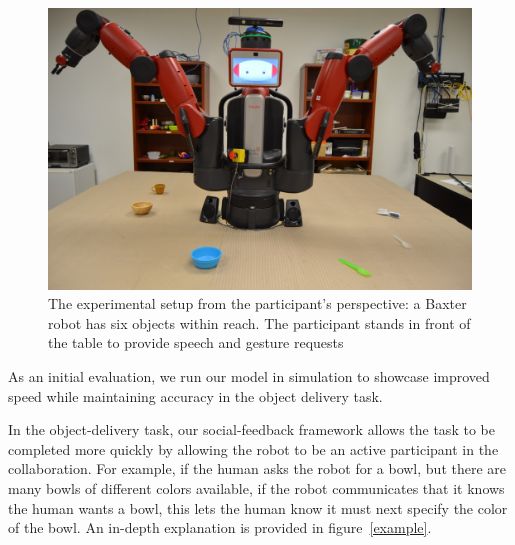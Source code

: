 \documentclass[conference]{IEEEtran}
\begin{document}
\begin{figure}[t]
	\begin{center}
		\includegraphics[scale=0.17]{resources/firstPerson}
		\caption{The experimental setup from the participant's perspective: a Baxter robot has six objects within reach. The participant stands in front of the table to provide speech and gesture requests}
	\end{center}
\end{figure}



As an initial evaluation, we run our model in simulation to showcase improved speed while maintaining accuracy in the object delivery task. 

In the object-delivery task, our social-feedback framework allows the task to be completed more quickly by allowing the robot to be an active participant in the collaboration. For example, if the human asks the robot for a bowl, but there are many bowls of different colors available, if the robot communicates that it knows the human wants a bowl, this lets the human know it must next specify the color of the bowl. An in-depth explanation is provided in figure~\ref{example}. 
\end{document}

